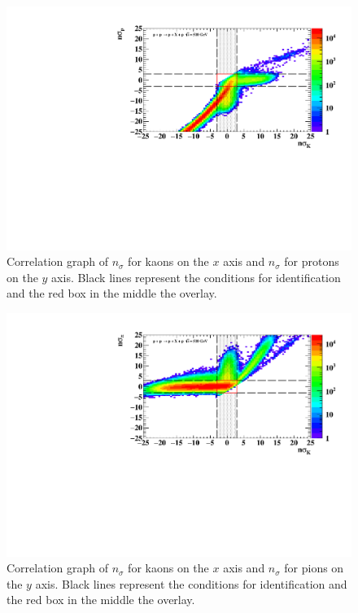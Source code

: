 \FloatBarrier
\begin{figure}[ht]
    \centering
    \includegraphics[width=1\textwidth]{figures/hNSigmaKPcorr.pdf}
    \caption[Correlation graph of $n\sigma_{K}$ and $n\sigma_{p}$ of measured particles]{Correlation graph of $n_{\sigma}$ for kaons on the $x$ axis and $n_{\sigma}$ for protons on the $y$ axis. Black lines represent the conditions for identification and the red box in the middle the overlay.}
    \label{a4}
\end{figure}
\FloatBarrier

\FloatBarrier
\begin{figure}[ht]
    \centering
    \includegraphics[width=1\textwidth]{figures/hNSigmaKPicorr.pdf}
    \caption[Correlation graph of $n\sigma_{K}$ and $n\sigma_{\pi}$ of measured particles]{Correlation graph of $n_{\sigma}$ for kaons on the $x$ axis and $n_{\sigma}$ for pions on the $y$ axis. Black lines represent the conditions for identification and the red box in the middle the overlay.}
    \label{a4}
\end{figure}
\FloatBarrier


